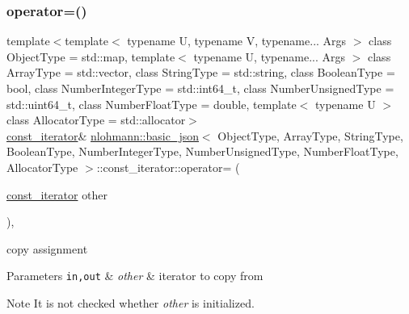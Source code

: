 \subsubsection{\texorpdfstring{operator=()}{operator=()}}
{\footnotesize\ttfamily template$<$template$<$ typename U, typename V, typename... Args $>$ class Object\+Type = std\+::map, template$<$ typename U, typename... Args $>$ class Array\+Type = std\+::vector, class String\+Type  = std\+::string, class Boolean\+Type  = bool, class Number\+Integer\+Type  = std\+::int64\+\_\+t, class Number\+Unsigned\+Type  = std\+::uint64\+\_\+t, class Number\+Float\+Type  = double, template$<$ typename U $>$ class Allocator\+Type = std\+::allocator$>$ \\
\hyperlink{classnlohmann_1_1basic__json_1_1const__iterator}{const\+\_\+iterator}\& \hyperlink{classnlohmann_1_1basic__json}{nlohmann\+::basic\+\_\+json}$<$ Object\+Type, Array\+Type, String\+Type, Boolean\+Type, Number\+Integer\+Type, Number\+Unsigned\+Type, Number\+Float\+Type, Allocator\+Type $>$\+::const\+\_\+iterator\+::operator= (\begin{DoxyParamCaption}\item[{\hyperlink{classnlohmann_1_1basic__json_1_1const__iterator}{const\+\_\+iterator}}]{other }\end{DoxyParamCaption})\hspace{0.3cm}{\ttfamily [inline]}, {\ttfamily [noexcept]}}



copy assignment 


\begin{DoxyParams}[1]{Parameters}
\mbox{\tt in,out}  & {\em other} & iterator to copy from \\
\hline
\end{DoxyParams}
\begin{DoxyNote}{Note}
It is not checked whether {\itshape other} is initialized. 
\end{DoxyNote}
\hypertarget{classnlohmann_1_1basic__json_1_1const__iterator_acf1fcb73ff770117446670cefc927dd2}{}\label{classnlohmann_1_1basic__json_1_1const__iterator_acf1fcb73ff770117446670cefc927dd2} 
